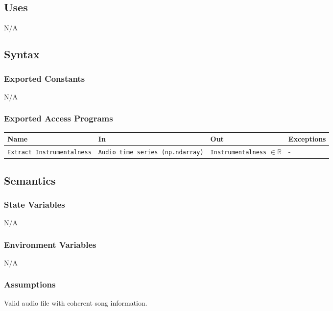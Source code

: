 \documentclass[12pt, titlepage]{article}
\begin{document}
\subsection{Uses}
N/A

\subsection{Syntax}

\subsubsection{Exported Constants}
N/A

\subsubsection{Exported Access Programs}

\begin{center}
\begin{tabular}{p{2cm} p{4cm} p{4cm} p{2cm}}
\hline
\textbf{Name} & \textbf{In} & \textbf{Out} & \textbf{Exceptions}\\
\hline%
\texttt{Extract Instrumentalness} &\texttt{Audio time series \linebreak\linebreak (np.ndarray)} &\texttt{Instrumentalness} $\in \mathbb{R}$ &-\\
\hline
\end{tabular}
\end{center}

\subsection{Semantics}

\subsubsection{State Variables}
N/A

\subsubsection{Environment Variables}
N/A

\subsubsection{Assumptions}
Valid audio file with coherent song information.
\end{document}

